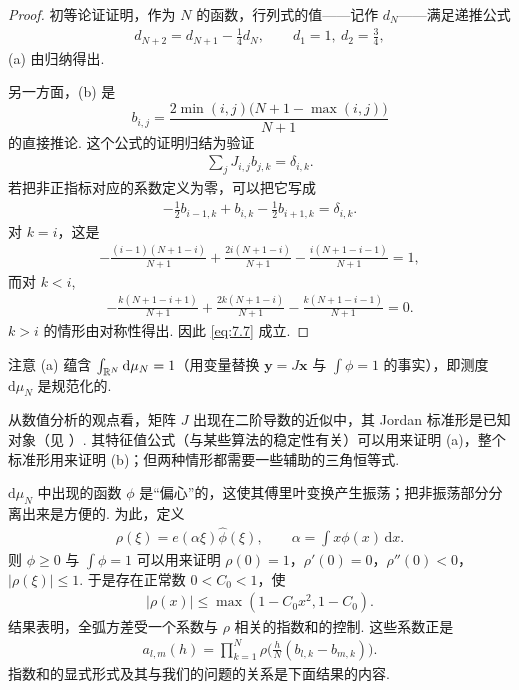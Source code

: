 \begin{proof}
初等论证证明，作为 $N$ 的函数，行列式的值——记作 $d_{N}$——满足递推公式
\begin{align*}
  d_{N+2}=d_{N+1}-\frac{1}{4}d_{N},\qquad d_{1}=1,\ d_{2}=\frac{3}{4},
\end{align*}
(a) 由归纳得出.

另一方面，(b) 是
\begin{equation}\label{eq:7.7}
  b_{i,j}=\frac{2\min(i,j)\bigl(N+1-\max(i,j)\bigr)}{N+1}
\end{equation}
的直接推论. 这个公式的证明归结为验证
\begin{align*}
  \sum_{j}J_{i,j}b_{j,k}=\delta_{i,k}.
\end{align*}
若把非正指标对应的系数定义为零，可以把它写成
\begin{align*}
  -\frac{1}{2}b_{i-1,k}+b_{i,k}-\frac{1}{2}b_{i+1,k}=\delta_{i,k}.
\end{align*}
对 $k = i$，这是
\begin{align*}
  -\frac{(i-1)(N+1-i)}{N+1}+\frac{2i(N+1-i)}{N+1}
  -\frac{i(N+1-i-1)}{N+1}=1,
\end{align*}
而对 $k < i$,
\begin{align*}
  -\frac{k(N+1-i+1)}{N+1}+\frac{2k(N+1-i)}{N+1}
  -\frac{k(N+1-i-1)}{N+1}=0.
\end{align*}
$k > i$ 的情形由对称性得出. 因此 \eqref{eq:7.7} 成立.
\end{proof}

\begin{remark}\label{rem:7.15}
注意 (a) 蕴含 $\int_{\mathbb{R}^N}\mathrm{d}\mu_N = 1$（用变量替换 $\mathbf{y} = J\mathbf{x}$ 与 $\int\phi = 1$ 的事实），即测度 $\mathrm{d}\mu_N$ 是规范化的.
\end{remark}

\begin{remark}\label{rem:7.16}
从数值分析的观点看，矩阵 $J$ 出现在二阶导数的近似中，其 Jordan 标准形是已知对象（见 \cite{b157}）. 其特征值公式（与某些算法的稳定性有关）可以用来证明 (a)，整个标准形用来证明 (b)；但两种情形都需要一些辅助的三角恒等式.
\end{remark}

$\mathrm{d}\mu_{N}$ 中出现的函数 $\phi$ 是``偏心''的，这使其傅里叶变换产生振荡；把非振荡部分分离出来是方便的. 为此，定义
\begin{align*}
  \rho(\xi)=e(\alpha\xi)\widehat{\phi}(\xi),\qquad
  \alpha=\int x\phi(x)\,\mathrm{d}x.
\end{align*}
则 $\phi \geq 0$ 与 $\int\phi = 1$ 可以用来证明 $\rho(0) = 1$，$\rho'(0) = 0$，$\rho''(0) < 0$，$|\rho(\xi)| \leq 1$. 于是存在正常数 $0 < C_0 < 1$，使
\begin{align*}
  |\rho(x)|\leq\max(1-C_{0}x^{2},1-C_{0}).
\end{align*}
结果表明，全弧方差受一个系数与 $\rho$ 相关的指数和的控制. 这些系数正是
\begin{align*}
  a_{l,m}(h)=\prod_{k=1}^{N}\rho\Big(\frac{h}{N}(b_{l,k}-b_{m,k})\Big).
\end{align*}
指数和的显式形式及其与我们的问题的关系是下面结果的内容.

